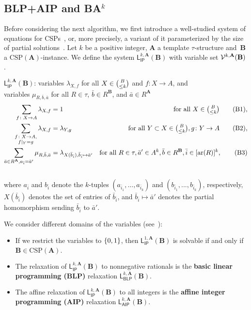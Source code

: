 \documentclass[a4paper,english, thm-restate]{lipics-v2021}
\newcommand{\defining}[1]{\textbf{#1}}
\DeclarePairedDelimiter\set{\lbrace}{\rbrace}
\newcommand{\tup}[1]{\bar{#1}}
\newcommand{\sig}{\tau}
\newcommand{\arity}[1]{\operatorname*{ar}(#1)}
\newcommand{\StructA}{\mathbf{A}}
\newcommand{\StructB}{\mathbf{B}}
\newcommand{\CSP}[1]{\mathrm{CSP}(#1)}
\newcommand{\restrict}[2]{#1|_{#2}}
\newcommand{\leqs}{\mathsf{L}}
\newcommand{\ipk}[3]{\leqs^{#1,#2}_{\mathsf{IP}} (#3)}
\newcommand{\blk}[3]{\leqs^{#1,#2}_{\mathsf{BLP}} (#3)}
\newcommand{\aipk}[3]{\leqs^{#1,#2}_{\mathsf{AIP}} (#3)}
\begin{document}
	\subsection{BLP+AIP and BA\texorpdfstring{$^k$}{k}}
	\label{app:BLP}
	Before considering the next algorithm,
	we first introduce a well-studied system of equations for CSPs~\cite{BartoBKO2021,BrakensiekGWZ2020}, or, more precisely, 
	a variant of it parameterized by the size of partial solutions~\cite{CiardoZivny2023GraphColoring}.
	Let $k$ be a positive integer, $\StructA$ a template $\sig$-structure
	and~$\StructB$ a $\CSP{\StructA}$-instance.
	We define the system
	$\ipk{k}{\StructA}{\StructB}$ with variable set $\VarsIP{k}{\StructA}{\StructB}$.
	\begin{systembox}{$\ipk{k}{\StructA}{\StructB}$: 
			variables $\lambda_{X,f}$ for all $X \in \tbinom{B}{\leq k}$ and  $f\colon X \to A$, and \\\phantom{$\ipk{k}{\StructA}{\StructB}$: }variables $\mu_{R,\tup{b},\tup{a}}$ for all $R \in \sig$, $\tup{b} \in R^\StructB$, and $\tup{a} \in R^\StructA$}
		\begin{align}
			\sum_{f \colon X \to A} \lambda_{X,f} &= 1  &\text{for all } X \in \tbinom{B}{\leq k} \label{eqn:ip-only-one-local-solution}\tag{B1},\\
			\sum_{\substack{f \colon X \to A,\\\restrict{f}{Y} = g}} \lambda_{X,f} &= \lambda_{Y,g} & \text{for all } Y\subset X \in \tbinom{B}{\leq k}, g\colon Y \to A\label{eqn:local-solutions-consistent}\tag{B2},\\
			\sum_{\tup{a} \in R^\StructA, a_{\tup{i}} = \tup{a}'} \mu_{R,\tup{b},\tup{a}} &= \lambda_{X(\tup{b}_{\tup{i}}), \tup{b}_{\tup{i}} \mapsto \tup{a}' } &  \text {for all } R \in \sig, \tup{a}' \in A^k, \tup{b} \in R^\StructB, \tup{i} \in [\arity{R}]^k,\label{eqn:ip-hom}\tag{B3}
		\end{align}\\
		where $a_{\tup{i}}$ and $b_{\tup{i}}$ denote the $k$-tuples $(a_{\tup{i}_1},...,a_{\tup{i}_k})$ and $(b_{\tup{i}_1},...,b_{\tup{i}_k})$, respectively, $X(\tup{b}_{\tup{i}})$ denotes the set of entries of $\tup{b}_{\tup{i}}$, and $\tup{b}_{\tup{i}} \mapsto \tup{a}'$ denotes the partial homomorphism sending $\tup{b}_{\tup{i}}$ to $\tup{a}'$.
	\end{systembox}
	\noindent We consider different domains of the variables (see~\cite{BrakensiekGWZ2020}):
	\begin{itemize}
		\item If we restrict the variables to $\set{0,1}$, then
		$\ipk{1}{\StructA}{\StructB}$ is solvable if and only if
		$\StructB \in \CSP{\StructA}$.
		\item The relaxation of $\ipk{k}{\StructA}{\StructB}$ to nonnegative rationals is the \defining{basic linear programming (BLP)} relaxation $\blk{k}{\StructA}{\StructB}$.
		\item The affine relaxation of $\ipk{k}{\StructA}{\StructB}$ to all integers is the \defining{affine integer programming (AIP)} relaxation $\aipk{k}{\StructA}{\StructB}$.
	\end{itemize}
\end{document}
